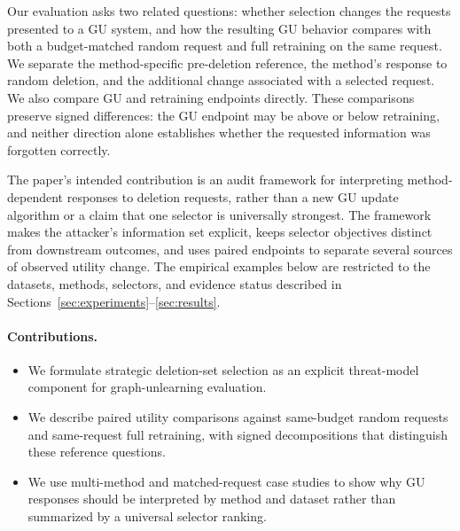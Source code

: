 Our evaluation asks two related questions: whether selection changes the requests presented to a GU system, and how the resulting GU behavior compares with both a budget-matched random request and full retraining on the same request. We separate the method-specific pre-deletion reference, the method's response to random deletion, and the additional change associated with a selected request. We also compare GU and retraining endpoints directly. These comparisons preserve signed differences: the GU endpoint may be above or below retraining, and neither direction alone establishes whether the requested information was forgotten correctly.

The paper's intended contribution is an audit framework for interpreting method-dependent responses to deletion requests, rather than a new GU update algorithm or a claim that one selector is universally strongest. The framework makes the attacker's information set explicit, keeps selector objectives distinct from downstream outcomes, and uses paired endpoints to separate several sources of observed utility change. The empirical examples below are restricted to the datasets, methods, selectors, and evidence status described in Sections~\ref{sec:experiments}--\ref{sec:results}.

\paragraph{Contributions.}
\begin{itemize}
  \item We formulate strategic deletion-set selection as an explicit threat-model component for graph-unlearning evaluation.
  \item We describe paired utility comparisons against same-budget random requests and same-request full retraining, with signed decompositions that distinguish these reference questions.
  \item We use multi-method and matched-request case studies to show why GU responses should be interpreted by method and dataset rather than summarized by a universal selector ranking.
\end{itemize}
